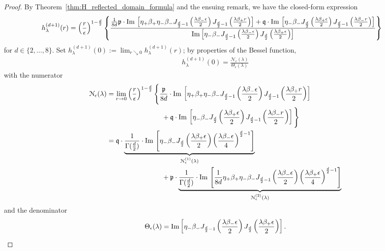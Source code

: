 \documentclass[11pt,a4paper,english,reqno]{amsart}
\theoremstyle{plain}
\newcommand{\e}{\epsilon}
\newcommand{\1}{\mathbbm{1}}
\begin{document}
\begin{proof}
By Theorem~\ref{thm:H_reflected_domain_formula} and the ensuing remark,   we have the closed-form expression
\begin{eqnarray*}
h^{(d+1)}_\lambda(r) &=\left(\frac{r}{\e}\right)^{1-\frac{d}{2}} \left\{ \frac{\frac{1}{8d}\mathfrak{p}\cdot  {\rm Im}\,\left[\eta_{+}\beta_{+}\eta_-\beta_-J_{\frac{d}{2}-1}\left(\frac{\lambda\beta_-\e}{2}\right)J_{\frac{d}{2}-1}\left(\frac{\lambda\beta_+r}{2}\right)\right]  +\mathfrak{q}\cdot {\rm Im}\,\left[ \eta_{-}\beta_{-}J_{\frac{d}{2}}\left(\frac{\lambda\beta_+\e}{2}\right)J_{\frac{d}{2}-1}\left(\frac{\lambda\beta_- r}{2}\right)\right] }{{\rm Im}\left[\eta_-\beta_-J_{\frac{d}{2}-1}\left(\frac{\lambda\beta_-\e}{2}\right) J_{\frac{d}{2}}\left(\frac{\lambda\beta_+\e}{2}\right) \right]}\right\}
\end{eqnarray*}
for $d \in \{2, \dots, 8\}$. Set $h^{(d+1)}_\lambda(0):= \lim_{r\searrow 0} h^{(d+1)}_\lambda(r)$; by properties of the Bessel function,
\begin{align*}
h^{(d+1)}_\lambda(0) =\frac{\mathcal{N}_{\e}(\lambda)}{\Theta_{\e}(\lambda)}
\end{align*}
with the numerator
\begin{align}\label{NNN}
\mathcal{N}_{\e}(\lambda) &= \underset{r \rightarrow 0}{\lim}\left(\frac{r}{\e}\right)^{1-\frac{d}{2}}  \Bigg\{\frac{\mathfrak{p}}{8d}\cdot  {\rm Im}\,\left[\eta_{+}\beta_{+}\eta_-\beta_-J_{\frac{d}{2}-1}\left(\frac{\lambda\beta_-\e}{2}\right)J_{\frac{d}{2}-1}\left(\frac{\lambda\beta_+r}{2}\right)\right] \nonumber\\
&\qquad\qquad\qquad\qquad+\mathfrak{q}\cdot {\rm Im}\,\left[ \eta_{-}\beta_{-}J_{\frac{d}{2}}\left(\frac{\lambda\beta_+\e}{2}\right)J_{\frac{d}{2}-1}\left(\frac{\lambda\beta_- r}{2}\right)\right]\Bigg\}\nonumber\\
&=\mathfrak{q} \cdot \underbrace{\frac{1}{\Gamma(\frac{d}{2})}\cdot{\rm Im}\,\left[\eta_{-}\beta_{-}J_{\frac{d}{2}}\left(\frac{\lambda\beta_+\e}{2}\right)\left(\frac{\lambda\beta_- \e}{4}\right)^{\frac{d}{2}-1}\right]}_{\mathcal{N}^{(1)}_{\e}(\lambda)}  \nonumber\\
&\qquad\qquad\qquad\qquad+\mathfrak{p}\cdot  \underbrace{\frac{1}{\Gamma(\frac{d}{2})}\cdot{\rm Im}\,\left[\frac{1}{8d} \eta_{+}\beta_{+}\eta_-\beta_-J_{\frac{d}{2}-1}\left(\frac{\lambda\beta_-\e}{2}\right)\left(\frac{\lambda\beta_+\e}{4}\right)^{\frac{d}{2}-1} \right]}_{\mathcal{N}^{(2)}_{\e}(\lambda)}
\end{align}
and the denominator $$\Theta_{\e}(\lambda) = {\rm Im}\left[\eta_-\beta_-J_{\frac{d}{2}-1}\left(\frac{\lambda\beta_-\e}{2}\right) J_{\frac{d}{2}}\left(\frac{\lambda\beta_+\e}{2}\right) \right].$$



\end{proof}
\end{document}
